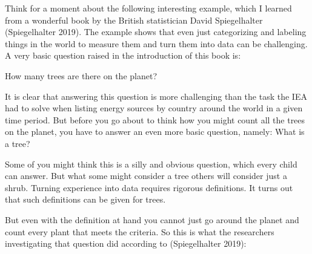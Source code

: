 \documentclass[
  letterpaper,
]{scrbook}
\begin{document}
Think for a moment about the following interesting example, which I
learned from a wonderful book by the British statistician David
Spiegelhalter (Spiegelhalter 2019). The example shows that even just
categorizing and labeling things in the world to measure them and turn
them into data can be challenging. A very basic question raised in the
introduction of this book is:

\begin{tcolorbox}[enhanced jigsaw, toprule=.15mm, colbacktitle=quarto-callout-note-color!10!white, breakable, coltitle=black, rightrule=.15mm, bottomtitle=1mm, bottomrule=.15mm, titlerule=0mm, title={Question:}, arc=.35mm, leftrule=.75mm, toptitle=1mm, left=2mm, opacityback=0, opacitybacktitle=0.6, colframe=quarto-callout-note-color-frame, colback=white]
How many trees are there on the planet?
\end{tcolorbox}

It is clear that answering this question is more challenging than the
task the IEA had to solve when listing energy sources by country around
the world in a given time period. But before you go about to think how
you might count all the trees on the planet, you have to answer an even
more basic question, namely: What is a tree?

Some of you might think this is a silly and obvious question, which
every child can answer. But what some might consider a tree others will
consider just a shrub. Turning experience into data requires rigorous
definitions. It turns out that such definitions can be given for trees.

But even with the definition at hand you cannot just go around the
planet and count every plant that meets the criteria. So this is what
the researchers investigating that question did according to
(Spiegelhalter 2019):
\end{document}
